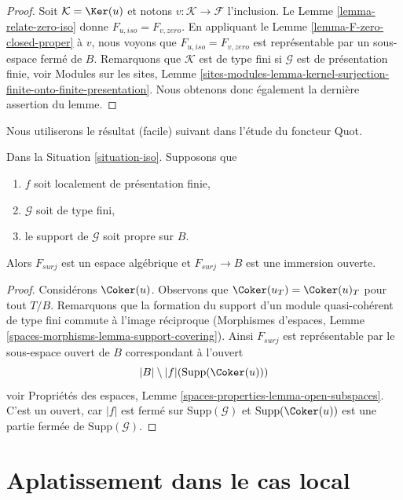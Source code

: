 \begin{proof}
Soit $\mathcal{K} = \Ker(u)$ et notons $v : \mathcal{K} \to \mathcal{F}$
l'inclusion. Le Lemme \ref{lemma-relate-zero-iso} donne
$F_{u, iso} = F_{v, zero}$. En appliquant le Lemme \ref{lemma-F-zero-closed-proper}
à $v$, nous voyons que $F_{u, iso} = F_{v, zero}$ est représentable
par un sous-espace fermé de $B$. Remarquons que $\mathcal{K}$ est de type fini
si $\mathcal{G}$ est de présentation finie, voir
Modules sur les sites, Lemme
\ref{sites-modules-lemma-kernel-surjection-finite-onto-finite-presentation}.
Nous obtenons donc également la dernière assertion du lemme.
\end{proof}

\noindent
Nous utiliserons le résultat (facile) suivant dans l'étude du foncteur Quot.

\begin{lemma}
\label{lemma-F-surj-open}
Dans la Situation \ref{situation-iso}. Supposons que
\begin{enumerate}
\item $f$ soit localement de présentation finie,
\item $\mathcal{G}$ soit de type fini,
\item le support de $\mathcal{G}$ soit propre sur $B$.
\end{enumerate}
Alors $F_{surj}$ est un espace algébrique et $F_{surj} \to B$
est une immersion ouverte.
\end{lemma}

\begin{proof}
Considérons $\Coker(u)$. Observons que
$\Coker(u_T) = \Coker(u)_T$ pour tout $T/B$.
Remarquons que la formation du support d'un module
quasi-cohérent de type fini commute à l'image réciproque
(Morphismes d'espaces, Lemme \ref{spaces-morphisms-lemma-support-covering}).
Ainsi $F_{surj}$ est représentable par le sous-espace ouvert de $B$
correspondant à l'ouvert
$$
|B| \setminus |f|(\text{Supp}(\Coker(u)))
$$
voir Propriétés des espaces, Lemme \ref{spaces-properties-lemma-open-subspaces}.
C'est un ouvert, car $|f|$ est fermé sur $\text{Supp}(\mathcal{G})$
et $\text{Supp}(\Coker(u))$ est une partie fermée de
$\text{Supp}(\mathcal{G})$.
\end{proof}






\section{Aplatissement dans le cas local}
\label{section-flattening-local}

